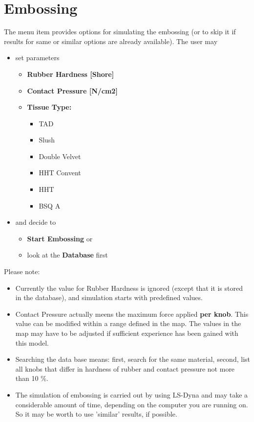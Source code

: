\section{Embossing}

The menu item provides options for simulating the embossing (or to skip it if results for same
or similar options are already available). The user may 

\begin{itemize} 
\item set parameters
	\begin{itemize}
	\item {\bf Rubber Hardness [Shore]}   
	\item {\bf Contact Pressure [N/cm2]}
	\item {\bf Tissue Type:}
		\begin{itemize}
		\item TAD
		\item Slush
		\item Double Velvet
		\item HHT Convent
		\item HHT
		\item BSQ A
		\end{itemize}
	\end{itemize} 		 
\item and decide to 
	\begin{itemize}
	\item {\bf Start Embossing} or  
	\item look at the {\bf Database} first
	\end{itemize}
\end{itemize}

Please note:

\begin{itemize}

\item Currently the value for Rubber Hardness is ignored (except that it is stored in the database), 
and simulation starts with predefined values.

\item Contact Pressure actually meens the maximum force applied {\bf per knob}. This value
can be modified within a range defined in the map. The values in the map may have to be
adjusted if sufficient experience has been gained with this model.
 
\item Searching the data base means: first, search for the same material, 
second, list all knobs that differ in hardness of rubber and contact pressure 
not more than 10 \%.
\item The simulation of embossing is carried out by using LS-Dyna and may take a
considerable amount of time, depending on the computer you are running on. So it may be
worth to use 'similar' results, if possible.

\end{itemize}
	
